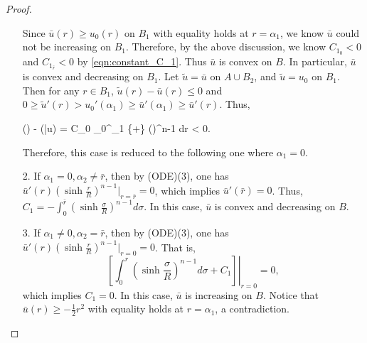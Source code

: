 \begin{proof}
\begin{itemize}
		Since $\bar{u}(r) \ge u_{0} (r)$ on $B_1$ with equality holds at $r= \alpha_1$, we know $\bar{u}$ could not be increasing on $B_1$. Therefore, by the above discussion, we know $C_{1_0} <0$ and $C_{1_{\bar{r}}}<0$ by \eqref{eqn:constant_C_1}. Thus $\bar{u}$ is convex on $B$. In particular,  $\bar{u}$ is convex and decreasing on $B_1$. Let $\tilde{u} = \bar{u}$ on $A \cup B_2$, and $\tilde{u} = u_{0}$ on $B_1$. Then for any $r\in B_1$, $\tilde{u}(r) - \bar{u}(r) \le 0$ and $0\ge  \tilde{u}'(r)> u_{0}'(\alpha_1) \ge \bar{u}'(\alpha_1) \ge \bar{u}'(r) $. Thus,
		\begin{flalign}
			() - (\bar{u}) = C_0 \int_{0}^{\alpha_1} \left\{+\right\} \left(\sinh{}\right)^{n-1} dr < 0.
		\end{flalign}
		Therefore, this case is reduced to the following one where $\alpha_1 =0$.
	
		\item[2.] 	If $\alpha_1=0, \alpha_2\neq\bar{r}$, then by (ODE)(3), one has $\bar{u}'(r)(\sinh\frac{r}{R})^{n-1}|_{r=\bar{r}} =0$, which implies $\bar{u}'(\bar{r}) =0$. Thus, $C_1 = -\int_{0}^{\bar{r}} (\sinh\frac{\sigma }{R})^{n-1} d\sigma $. In this case, $\bar{u}$ is convex and decreasing on $B$.
		
		\item [3.] If $\alpha_1\neq0,\alpha_2=\bar{r}$, then by (ODE)(3), one has $\bar{u}'(r)(\sinh\frac{r}{R})^{n-1}|_{r=0} =0$. That is,  $$\left.\left[\int_{0}^{r} \left(\sinh\frac{\sigma }{R}\right)^{n-1} d\sigma  +C_1\right]\right|_{r=0} =0,$$ 
		which implies $C_1 = 0$. In this case, $\bar{u}$ is increasing on $B$. Notice that $\bar{u}(r)\ge -\frac{1}{2} r^2$ with equality holds at $r=\alpha_1$, a contradiction.
	\end{itemize}


\end{proof}
